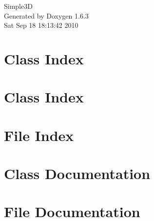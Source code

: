 \documentclass[a4paper]{book}
\begin{document}
\hypersetup{pageanchor=false}
\begin{titlepage}
\vspace*{7cm}
\begin{center}
{\Large Simple3D }\\
\vspace*{1cm}
{\large Generated by Doxygen 1.6.3}\\
\vspace*{0.5cm}
{\small Sat Sep 18 18:13:42 2010}\\
\end{center}
\end{titlepage}
\clearemptydoublepage
{}
\tableofcontents
\clearemptydoublepage
{}
\hypersetup{pageanchor=true}
\chapter{Class Index}

\chapter{Class Index}

\chapter{File Index}

\chapter{Class Documentation}












\chapter{File Documentation}















\printindex
\end{document}

